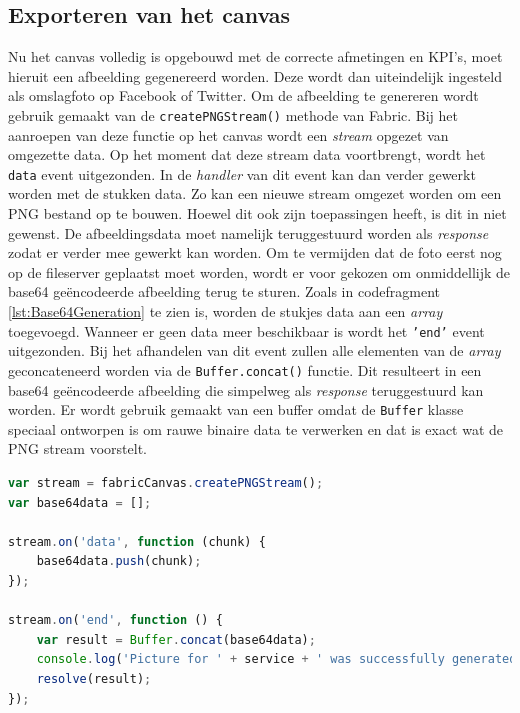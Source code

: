 \subsection{Exporteren van het canvas} \label{ExporterenVanHetCanvas}
Nu het canvas volledig is opgebouwd met de correcte afmetingen en KPI's, moet hieruit een afbeelding gegenereerd worden. Deze wordt dan uiteindelijk ingesteld als omslagfoto op Facebook of Twitter. Om de afbeelding te genereren wordt gebruik gemaakt van de \texttt{createPNGStream()} methode van Fabric. Bij het aanroepen van deze functie op het canvas wordt een \textit{stream} opgezet van omgezette data. %
Op het moment dat deze stream data voortbrengt, wordt het \texttt{data} event uitgezonden. In de \textit{handler} van dit event kan dan verder gewerkt worden met de stukken data. Zo kan een nieuwe stream omgezet worden om een PNG bestand op te bouwen. %
Hoewel dit ook zijn toepassingen heeft, is dit in niet gewenst. De afbeeldingsdata moet namelijk teruggestuurd worden als \textit{response} zodat er verder mee gewerkt kan worden. 
Om te vermijden dat de foto eerst nog op de fileserver geplaatst moet worden, wordt er voor gekozen om onmiddellijk de base64 ge\"{e}ncodeerde afbeelding terug te sturen. Zoals in codefragment \ref{lst:Base64Generation} te zien is, worden de stukjes data aan een \textit{array} toegevoegd. Wanneer er geen data meer beschikbaar is wordt het \texttt{'end'} event uitgezonden. Bij het afhandelen van dit event zullen alle elementen van de \textit{array} geconcateneerd worden via de \texttt{Buffer.concat()} functie. Dit resulteert in een base64 ge\"{e}ncodeerde afbeelding die simpelweg als \textit{response} teruggestuurd kan worden. Er wordt gebruik gemaakt van een buffer omdat de \texttt{Buffer} klasse speciaal ontworpen is om rauwe binaire data te verwerken en dat is exact wat de PNG stream voorstelt. %

\begin{lstlisting}[caption={renderer.js - aanmaken van base64},label=lst:Base64Generation,language=javascript]
var stream = fabricCanvas.createPNGStream();
var base64data = [];

stream.on('data', function (chunk) {
	base64data.push(chunk);
});

stream.on('end', function () {
	var result = Buffer.concat(base64data);
	console.log('Picture for ' + service + ' was successfully generated');
	resolve(result);
});
\end{lstlisting}


